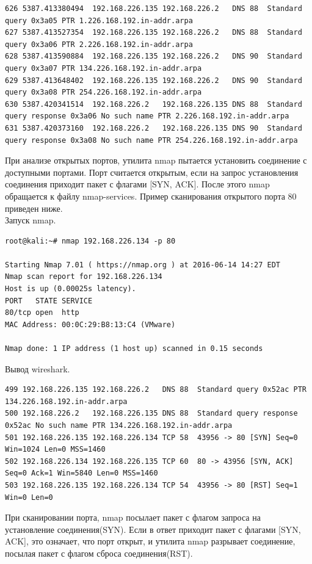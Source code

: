 \documentclass[10pt,a4paper,titlepage]{article}
\begin{document}
\begin{verbatim}
626	5387.413380494	192.168.226.135	192.168.226.2	DNS	88	Standard query 0x3a05 PTR 1.226.168.192.in-addr.arpa
627	5387.413527354	192.168.226.135	192.168.226.2	DNS	88	Standard query 0x3a06 PTR 2.226.168.192.in-addr.arpa
628	5387.413590884	192.168.226.135	192.168.226.2	DNS	90	Standard query 0x3a07 PTR 134.226.168.192.in-addr.arpa
629	5387.413648402	192.168.226.135	192.168.226.2	DNS	90	Standard query 0x3a08 PTR 254.226.168.192.in-addr.arpa
630	5387.420341514	192.168.226.2	192.168.226.135	DNS	88	Standard query response 0x3a06 No such name PTR 2.226.168.192.in-addr.arpa
631	5387.420373160	192.168.226.2	192.168.226.135	DNS	90	Standard query response 0x3a08 No such name PTR 254.226.168.192.in-addr.arpa
\end{verbatim}
		
При анализе открытых портов, утилита nmap пытается установить 
соединение с доступными портами. Порт считается открытым, если на запрос установления соединения приходит пакет с флагами [SYN, ACK]. После этого nmap обращается к файлу nmap-services. Пример сканирования открытого порта 80 приведен ниже.\\

Запуск nmap.
\begin{verbatim}
root@kali:~# nmap 192.168.226.134 -p 80

Starting Nmap 7.01 ( https://nmap.org ) at 2016-06-14 14:27 EDT
Nmap scan report for 192.168.226.134
Host is up (0.00025s latency).
PORT   STATE SERVICE
80/tcp open  http
MAC Address: 00:0C:29:B8:13:C4 (VMware)

Nmap done: 1 IP address (1 host up) scanned in 0.15 seconds
\end{verbatim}

Вывод wireshark.

\begin{verbatim}
499	192.168.226.135	192.168.226.2	DNS	88	Standard query 0x52ac PTR 134.226.168.192.in-addr.arpa
500	192.168.226.2	192.168.226.135	DNS	88	Standard query response 0x52ac No such name PTR 134.226.168.192.in-addr.arpa
501	192.168.226.135	192.168.226.134	TCP	58	43956 -> 80 [SYN] Seq=0 Win=1024 Len=0 MSS=1460
502	192.168.226.134	192.168.226.135	TCP	60	80 -> 43956 [SYN, ACK] Seq=0 Ack=1 Win=5840 Len=0 MSS=1460
503	192.168.226.135	192.168.226.134	TCP	54	43956 -> 80 [RST] Seq=1 Win=0 Len=0
\end{verbatim}
		
При сканировании порта, nmap посылает пакет с флагом запроса на установление соединения(SYN). Если в ответ приходит пакет с флагами [SYN, ACK], это означает, что порт открыт, и утилита nmap разрывает соединение, посылая пакет с флагом сброса соединения(RST).
		
\end{document}
